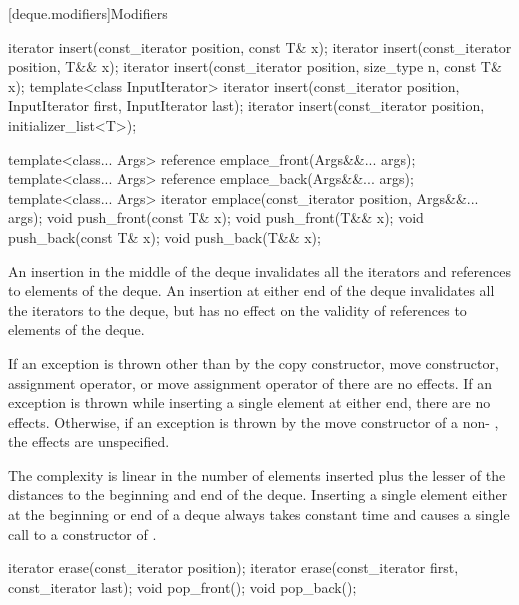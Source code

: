 [deque.modifiers]{Modifiers}

%
%
%
%
\begin{itemdecl}
iterator insert(const_iterator position, const T& x);
iterator insert(const_iterator position, T&& x);
iterator insert(const_iterator position, size_type n, const T& x);
template<class InputIterator>
  iterator insert(const_iterator position,
                  InputIterator first, InputIterator last);
iterator insert(const_iterator position, initializer_list<T>);

template<class... Args> reference emplace_front(Args&&... args);
template<class... Args> reference emplace_back(Args&&... args);
template<class... Args> iterator emplace(const_iterator position, Args&&... args);
void push_front(const T& x);
void push_front(T&& x);
void push_back(const T& x);
void push_back(T&& x);
\end{itemdecl}

\begin{itemdescr}
\pnum
\effects
An insertion in the middle of the deque invalidates all the iterators and
references to elements of the deque.
An insertion at either end of the
deque invalidates all the iterators to the deque, but has no effect on
the validity of references to elements of the deque.

\pnum
\remarks
If an exception is thrown other than by the
copy constructor, move constructor,
assignment operator, or move assignment operator of
there are no effects.
If an exception is thrown while inserting a single element at either end,
there are no effects.
Otherwise, if an exception is thrown by the move constructor of a
non-
, the effects are unspecified.

\pnum
\complexity
The complexity is linear in the number of elements inserted plus the lesser
of the distances to the beginning and end of the deque.
Inserting a single element either at the beginning or end of a deque always takes constant time
and causes a single call to a constructor of
.
\end{itemdescr}

%
\begin{itemdecl}
iterator erase(const_iterator position);
iterator erase(const_iterator first, const_iterator last);
void pop_front();
void pop_back();
\end{itemdecl}

